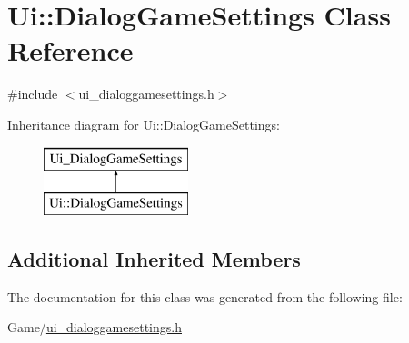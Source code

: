 \hypertarget{class_ui_1_1_dialog_game_settings}{\section{Ui\-:\-:Dialog\-Game\-Settings Class Reference}
\label{class_ui_1_1_dialog_game_settings}
}


{\ttfamily \#include $<$ui\-\_\-dialoggamesettings.\-h$>$}

Inheritance diagram for Ui\-:\-:Dialog\-Game\-Settings\-:\begin{figure}[H]
\begin{center}
\leavevmode
\includegraphics[height=2.000000cm]{class_ui_1_1_dialog_game_settings}
\end{center}
\end{figure}
\subsection*{Additional Inherited Members}


The documentation for this class was generated from the following file\-:\begin{DoxyCompactItemize}
\item 
Game/\hyperlink{ui__dialoggamesettings_8h}{ui\-\_\-dialoggamesettings.\-h}\end{DoxyCompactItemize}
